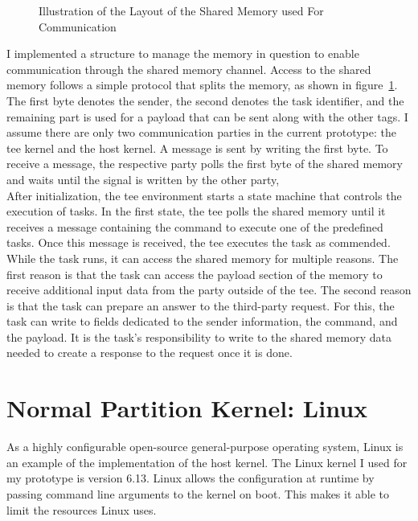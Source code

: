 \begin{center}
    \begin{figure}
        \centering
        
        \caption{Illustration of the Layout of the Shared Memory used For Communication}
        \label{fig:impl:shared_mem_layout}
    \end{figure}
\end{center}

I implemented a structure to manage the memory in question to enable
communication through the shared memory channel. Access to the shared memory
follows a simple protocol that splits the memory, as shown in
figure~\ref{fig:impl:shared_mem_layout}. The first byte denotes the sender, the
second denotes the task identifier, and the remaining part is used for a payload
that can be sent along with the other tags. I assume there are only two
communication parties in the current prototype: the \gls{tee} kernel and the
host kernel. A message is sent by writing the first byte. To receive a message,
the respective party polls the first byte of the shared memory and waits until
the signal is written by the other party, \\

After initialization, the \gls{tee} environment starts a state machine that
controls the execution of tasks. In the first state, the \gls{tee} polls the
shared memory until it receives a message containing the command to execute one
of the predefined tasks. Once this message is received, the \gls{tee} executes
the task as commended. While the task runs, it can access the shared memory for
multiple reasons. The first reason is that the task can access the payload
section of the memory to receive additional input data from the party outside of
the \gls{tee}. The second reason is that the task can prepare an answer to the
third-party request. For this, the task can write to fields dedicated to the
sender information, the command, and the payload. It is the task's
responsibility to write to the shared memory data needed to create a response to
the request once it is done.

\section{Normal Partition Kernel: Linux}
\label{sec:implementation:hostKernel}

As a highly configurable open-source general-purpose operating system, Linux is
an example of the implementation of the host kernel. The Linux kernel I used for
my prototype is version 6.13. Linux allows the configuration at runtime by
passing command line arguments to the kernel on boot. This makes it able to
limit the resources Linux uses. \\

